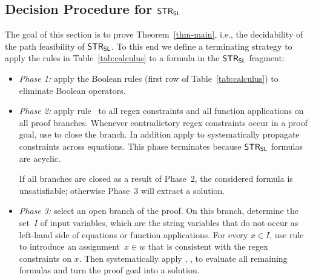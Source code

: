 
\subsection{Decision Procedure for $\mathsf{STR}_{\mathsf{SL}}$} \label{sec:decision}

The goal of this section is to prove Theorem~\ref{thm-main}, i.e., the
decidability of the path feasibility of $\mathsf{STR}_{\mathsf{SL}}$. To this
end we define a terminating strategy to apply the rules in
Table~\ref{tab:calculus} to a formula in the $\mathsf{STR}_{\mathsf{SL}}$
fragment:
\begin{itemize}
\item \emph{Phase 1:} apply the Boolean rules (first row of
  Table~\ref{tab:calculus}) to eliminate Boolean operators.
\item \emph{Phase 2:} apply rule~ to all regex
  constraints and all function applications on all proof
  branches. Whenever contradictory regex constraints occur in a proof
  goal, use  to close the branch. In addition apply
   to systematically propagate constraints across
  equations.  This phase terminates because $\mathsf{STR}_{\mathsf{SL}}$
  formulas are acyclic.

  If all branches are closed as a result of Phase~2, the considered
  formula is unsatisfiable; otherwise Phase~3 will extract a solution.
\item \emph{Phase 3:} select an open branch of the proof. On this
  branch, determine the set~$I$ of input variables, which are the
  string variables that do not occur as left-hand side of equations or
  function applications. For every $x \in I$, use rule~
  to introduce an assignment~$x \in w$ that is consistent with the
  regex constraints on $x$. Then systematically apply
  , ,  to
  evaluate all remaining formulas and turn the proof goal into a
  solution.
\end{itemize}

